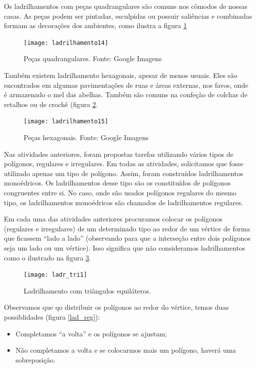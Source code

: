 

Os ladrilhamentos com peças quadrangulares são comuns nos cômodos de nossas casas. As peças podem ser pintadas, esculpidas ou possuir saliências e combinadas formam as decorações dos ambientes, como ilustra a figura \ref{lad_qd}
 


\begin{figure}[H]
\centering
\texttt{[image: ladrilhamento14]}
\label{lad_qd}
\caption{Peças quadrangulares. Fonte: Google Imagens }
\end{figure}

Também existem ladrilhamento hexagonais, apesar de menos usuais. Eles são encontrados em algumas pavimentações de ruas e áreas externas, nos favos, onde é armazenado o mel das abelhas. Também são comuns na confeção de colchas de retalhos  ou  de crochê (figura \ref{lad_hex}.

\begin{figure}[H]
\centering
\texttt{[image: ladrilhamento15]}
\label{lad_hex}
\caption{Peças hexagonais. Fonte: Google Imagens }
\end{figure}

Nas atividades anteriores, foram propostas tarefas utilizando vários tipos de polígonos, regulares e irregulares. Em todas as atividades, solicitamos que fosse utilizado apenas um tipo de polígono. Assim, foram construídos ladrilhamentos monoédricos. Os ladrilhamentos desse tipo são os constituídos de polígonos congruentes entre si. No caso, onde são usados polígonos regulares do mesmo tipo, os ladrilhamentos monoédricos são chamados de ladrilhamentos regulares.

Em cada uma das atividades anteriores procuramos colocar os polígonos (regulares e irregulares) de um determinado tipo ao redor de um vértice de forma que ficassem “lado a lado” (observando para que a interseção entre dois polígonos seja um lado ou um vértice). Isso significa que não consideramos ladrilhamentos como o ilustrado na figura \ref{ladr_tri1}. 

\begin{figure}[H]
\centering
\texttt{[image: ladr\_tri1]}
\label{ladr_tri1}
\caption{Ladrilhamento com triângulos equiláteros.}
\end{figure}


Observamos que qo distribuir os polígonos ao redor do vértice,  temos duas possiblidades (figura \ref{lad_reg}): 
\begin{itemize}
\item	Completamos “a volta” e os polígonos se ajustam;
\item 	Não completamos a volta e se colocarmos mais um polígono, haverá uma sobreposição.
\end{itemize}


